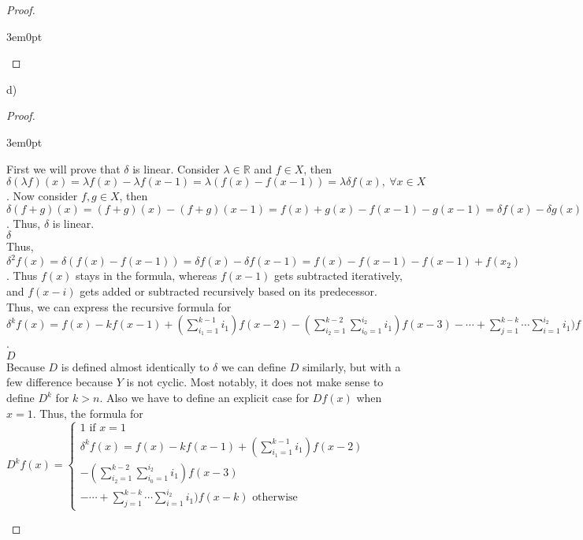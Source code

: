 \documentclass[11pt]{article}
\newcommand{\R}{\mathbb{R}}
\newenvironment{myproof}
{\begin{proof} \begin{adjustwidth}{3em}{0pt}$ $\par\nobreak\ignorespaces}
{\end{adjustwidth} \end{proof}}
\begin{document}
\begin{flushleft}
\begin{myproof}
\end{myproof}

d)

\begin{myproof}

First we will prove that $\delta$ is linear. Consider $\lambda \in \R$ and $f \in X$, then $\delta(\lambda f)(x) = \lambda f(x) - \lambda f(x-1) = \lambda(f(x) - f(x-1)) = \lambda \delta f(x), \ \forall x \in X$. Now consider $f,g \in X$, then $\delta(f+g)(x) = (f+g)(x) - (f+g)(x-1) = f(x) + g(x) -f(x-1) - g(x-1) = \delta f(x) - \delta g(x), \ \forall x \in X$. Thus, $\delta$ is linear. \\
\bigskip
$\delta$ \\
Thus, $\delta^2f(x) = \delta ( f(x) -  f(x-1)) = \delta f(x) - \delta f(x-1) = f(x) - f(x-1) - f(x-1) + f(x_2)$. Thus $f(x)$ stays in the formula, whereas $f(x-1)$ gets subtracted iteratively, and $f(x-i)$ gets added or subtracted recursively based on its predecessor. Thus, we can express the recursive formula for $\delta^kf(x) = f(x) - kf(x-1) + (\sum_{i_1=1}^{k-1} i_1)f(x-2) - (\sum_{i_2=1}^{k-2}\sum_{i_0=1}^{i_2} i_1)f(x-3) - \cdots + \sum_{j=1}^{k-k}\cdots\sum_{i=1}^{i_2} i_1)f(x-k)$. \\
\bigskip
$D$ \\
Because $D$ is defined almost identically to $\delta$ we can define $D$ similarly, but with a few difference because $Y$ is not cyclic. Most notably, it does not make sense to define $D^k$ for $k > n$. Also we have to define an explicit case for $Df(x)$ when $x = 1$. Thus, the formula for $D^k f(x) = \begin{cases} 1 \text{ if } x = 1 \\  \delta^kf(x) = f(x) - kf(x-1) + (\sum_{i_1=1}^{k-1} i_1)f(x-2) \\ - (\sum_{i_2=1}^{k-2}\sum_{i_0=1}^{i_2} i_1)f(x-3) \\ - \cdots + \sum_{j=1}^{k-k}\cdots\sum_{i=1}^{i_2} i_1)f(x-k) \text{ otherwise} \end{cases}$

\end{myproof}


\end{flushleft}
\end{document}

